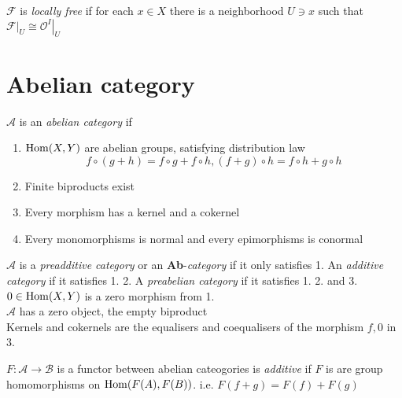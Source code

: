 \documentclass[main]{subfiles}
\begin{document}
\begin{definition}
$\mathcal F$ is \textit{locally free} if for each $x\in X$ there is a neighborhood $U\ni x$ such that $\mathcal F|_U\cong\left.\mathcal O^I\right|_U$
\end{definition}

\section{Abelian category}

\begin{definition}
$\mathscr A$ is an \textit{abelian category} if
\begin{enumerate}
\item $\operatorname{Hom}(X,Y)$ are abelian groups, satisfying distribution law
\[f\circ(g+h)=f\circ g+f\circ h,(f+g)\circ h=f\circ h+g\circ h\]
\item Finite biproducts exist
\item Every morphism has a kernel and a cokernel
\item Every monomorphisms is normal and every epimorphisms is conormal
\end{enumerate}
\end{definition}

\begin{note}
$\mathscr A$ is a \textit{preadditive category} or an \textbf{Ab}-\textit{category} if it only satisfies 1. An \textit{additive category} if it satisfies 1. 2. A \textit{preabelian category} if it satisfies 1. 2. and 3. \\
$0\in \operatorname{Hom}(X,Y)$ is a zero morphism from 1. \\
$\mathscr A$ has a zero object, the empty biproduct \\
Kernels and cokernels are the equalisers and coequalisers of the morphism $f,0$ in 3.
\end{note}

\begin{definition}
$F:\mathscr A\to\mathscr B$ is a functor between abelian cateogories is \textit{additive} if $F$ is are group homomorphisms on $\operatorname{Hom}(F(A),F(B))$. i.e. $F(f+g)=F(f)+F(g)$
\end{definition}
\end{document}
